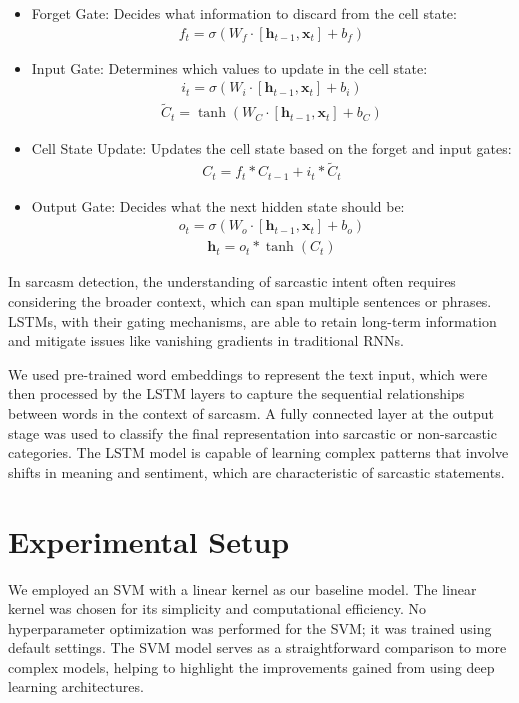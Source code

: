 \documentclass[11pt]{article}
\begin{document}
\begin{itemize}
    \item Forget Gate: Decides what information to discard from the cell state:
    \begin{align}
        f_t=\sigma(W_f\cdot[\textbf{h}_{t-1},\textbf{x}_t]+b_f)
    \end{align}
    \item Input Gate: Determines which values to update in the cell state:
    \begin{align}
        i_t=\sigma(W_i\cdot[\textbf{h}_{t-1},\textbf{x}_t]+b_i)
    \end{align}
    \begin{align}
        \tilde{C}_t=\tanh(W_C\cdot[\textbf{h}_{t-1},\textbf{x}_t]+b_C)
    \end{align}
    \item Cell State Update: Updates the cell state based on the forget and input gates:
    \begin{align}
        C_t=f_t*C_{t-1}+i_t*\tilde{C}_t
    \end{align}
    \item Output Gate: Decides what the next hidden state should be:
    \begin{align}
        o_t=\sigma(W_o\cdot[\textbf{h}_{t-1},\textbf{x}_t]+b_o)
    \end{align}
    \begin{align}
        \textbf{h}_t=o_t*\tanh(C_t)
    \end{align}
\end{itemize}

In sarcasm detection, the understanding of sarcastic intent often requires considering the broader context, which can span multiple sentences or phrases. LSTMs, with their gating mechanisms, are able to retain long-term information and mitigate issues like vanishing gradients in traditional RNNs.

We used pre-trained word embeddings to represent the text input, which were then processed by the LSTM layers to capture the sequential relationships between words in the context of sarcasm. A fully connected layer at the output stage was used to classify the final representation into sarcastic or non-sarcastic categories. The LSTM model is capable of learning complex patterns that involve shifts in meaning and sentiment, which are characteristic of sarcastic statements.

\section{Experimental Setup}
We employed an SVM with a linear kernel as our baseline model. The linear kernel was chosen for its simplicity and computational efficiency. No hyperparameter optimization was performed for the SVM; it was trained using default settings. The SVM model serves as a straightforward comparison to more complex models, helping to highlight the improvements gained from using deep learning architectures. 
\end{document}
